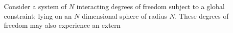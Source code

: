 Consider a system of $N$ interacting degrees of freedom subject to a global constraint; lying on an $N$ dimensional sphere of radius $N$. These degrees of freedom may also experience an extern